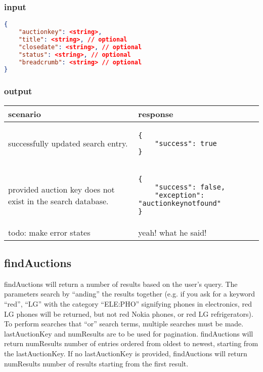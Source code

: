 \documentclass[12pt,a4paper]{article}
\begin{document}
\subsubsection{input}
\begin{lstlisting}[language=json,firstnumber=1]
{
    "auctionkey": <string>,
    "title": <string>, // optional
    "closedate": <string>, // optional
    "status": <string>, // optional
    "breadcrumb": <string> // optional
}
\end{lstlisting}

\subsubsection{output}
\begin{center}
    \begin{tabular}{| p{5cm} | l |}
        \hline
        \textbf{scenario} & \textbf{response} \\
        \hline
        successfully updated search entry. &
        \begin{lstlisting}[boxpos=t,language=tablejson,firstnumber=1]
{
    "success": true
}
        \end{lstlisting} \\ 
        \hline
        provided auction key does not exist in the search database. & 
        \begin{lstlisting}[boxpos=t,language=tablejson,firstnumber=1]
{
    "success": false,
    "exception": "auctionkeynotfound"
}
        \end{lstlisting} \\
        \hline
            todo: make error states & yeah! what he said! \\
        \hline
    \end{tabular}
\end{center}


\subsection{findAuctions}
findAuctions will return a number of results based on the user's query. The
parameters search by ``anding'' the results together (e.g. if you ask for a
keyword ``red'', ``LG'' with the category ``ELE:PHO'' signifying phones in
electronics, red LG phones will be returned, but not red Nokia phones, or red
LG refrigerators). To perform searches that ``or'' search terms, multiple
searches must be made. lastAuctionKey and numResults are to be used for
pagination. findAuctions will return numResults number of entries ordered from
oldest to newest, starting from the lastAuctionKey. If no lastAuctionKey is
provided, findAuctions will return numResults number of results starting from
the first result.
\end{document}
